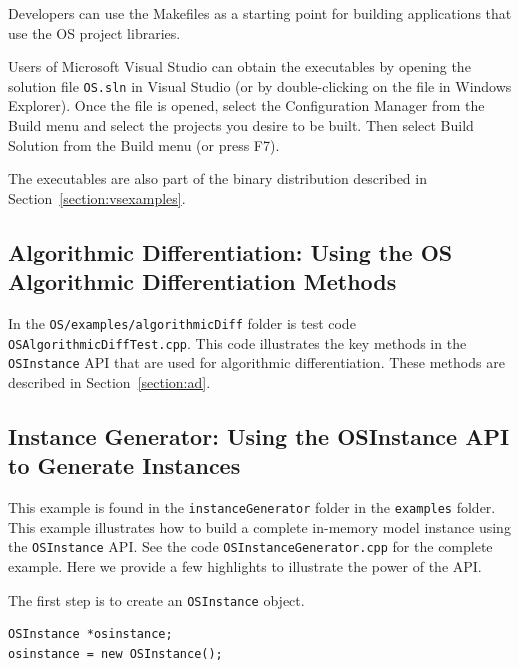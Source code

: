 \documentclass[11pt]{article}
\renewcommand{\_}{{\char"5F}}
\renewcommand{\{}{{\char"7B}}
\renewcommand{\}}{{\char"7D}}
\renewcommand{\^}{{\char"0D}}
\renewcommand{\'}{{\char"0D}}
\begin{document}
\begin{enumerate}[Step 1:]
Developers can use the Makefiles as a starting point for building applications that use the 
OS project libraries.

\medskip
Users of Microsoft Visual Studio can obtain the executables by opening the solution file 
{\tt OS.sln} in
Visual Studio (or by double-clicking on the file in Windows Explorer). Once the file is opened, 
select the Configuration Manager from the Build menu and select the projects you desire to be built. 
Then select Build Solution from the Build menu (or press F7). 

The executables are also part of the binary distribution described in Section~\ref{section:vsexamples}.


\subsection{Algorithmic Differentiation:  Using the OS Algorithmic Differentiation Methods}\label{section:cppad}

In the {\tt OS/examples/algorithmicDiff} folder is test code {\tt OSAlgorithmicDiffTest.cpp}. This code
illustrates the key methods in the {\tt OSInstance} API that are used for
algorithmic differentiation.   These methods are described in Section~\ref{section:ad}.



\subsection{Instance Generator: Using the OSInstance API to Generate Instances}\label{section:exampleOSInstanceGeneration}

This example is found in the {\tt instanceGenerator} folder in the {\tt examples} folder. This example illustrates
how to build a complete in-memory model instance using the {\tt OSInstance} API.
See the code {\tt OSInstanceGenerator.cpp} for the complete example. Here we provide a few highlights to illustrate
the power of the API.

The first step is to create an {\tt OSInstance} object.
\begin{verbatim}
OSInstance *osinstance;
osinstance = new OSInstance();
\end{verbatim}


\end{enumerate}
\end{document}

